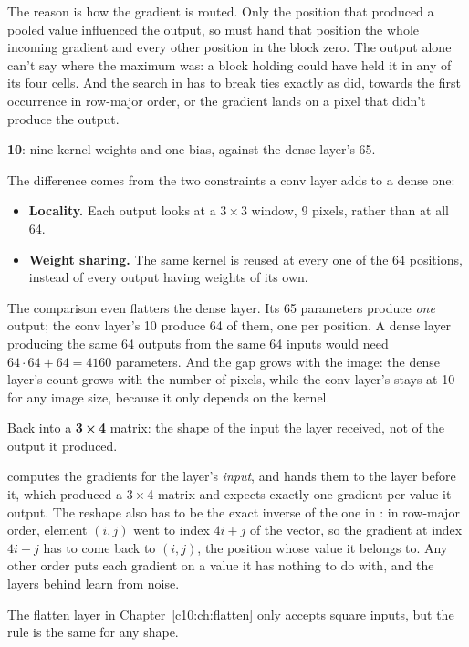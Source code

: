 The reason is how the gradient is routed. Only the position that produced a pooled value
influenced the output, so  must hand that position the whole incoming
gradient and every other position in the block zero. The output alone can't say where the maximum
was: a block holding  could have held it in any of its four cells. And the search in
 has to break ties exactly as  did, towards the first
occurrence in row-major order, or the gradient lands on a pixel that didn't produce the output.

\textbf{10}: nine kernel weights and one bias, against the dense layer's 65.

The difference comes from the two constraints a conv layer adds to a dense one:
\begin{itemize}
  \item \textbf{Locality.} Each output looks at a 3\,×\,3 window, 9 pixels, rather than at all 64.
  \item \textbf{Weight sharing.} The same kernel is reused at every one of the 64 positions,
    instead of every output having weights of its own.
\end{itemize}
The comparison even flatters the dense layer. Its 65 parameters produce \emph{one} output; the conv
layer's 10 produce 64 of them, one per position. A dense layer producing the same 64 outputs from
the same 64 inputs would need $64 \cdot 64 + 64 = 4160$ parameters. And the gap grows with the
image: the dense layer's count grows with the number of pixels, while the conv layer's stays at 10
for any image size, because it only depends on the kernel.

Back into a \textbf{3\,×\,4} matrix: the shape of the input the layer received, not of the output
it produced.

 computes the gradients for the layer's \emph{input}, and hands them to the
layer before it, which produced a 3\,×\,4 matrix and expects exactly one gradient per value it
output. The reshape also has to be the exact inverse of the one in : in
row-major order, element $(i, j)$ went to index $4i + j$ of the vector, so the gradient at index
$4i + j$ has to come back to $(i, j)$, the position whose value it belongs to. Any other order puts
each gradient on a value it has nothing to do with, and the layers behind learn from noise.

The flatten layer in Chapter~\ref{c10:ch:flatten} only accepts square inputs, but the rule is the
same for any shape.

